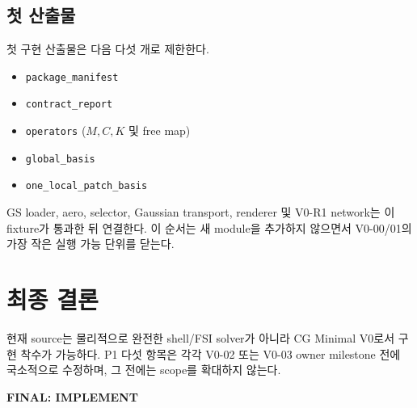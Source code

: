 \documentclass[11pt]{article}
\newcommand{\code}[1]{\texttt{\small #1}}
\begin{document}
\subsection{첫 산출물}

첫 구현 산출물은 다음 다섯 개로 제한한다.
\begin{itemize}
  \item \code{package\_manifest}
  \item \code{contract\_report}
  \item \code{operators} ($M,C,K$ 및 free map)
  \item \code{global\_basis}
  \item \code{one\_local\_patch\_basis}
\end{itemize}

GS loader, aero, selector, Gaussian transport, renderer 및 V0-R1 network는 이 fixture가 통과한 뒤 연결한다.
이 순서는 새 module을 추가하지 않으면서 V0-00/01의 가장 작은 실행 가능 단위를 닫는다.

\section*{최종 결론}

현재 source는 물리적으로 완전한 shell/FSI solver가 아니라 CG Minimal V0로서 구현 착수가 가능하다.
P1 다섯 항목은 각각 V0-02 또는 V0-03 owner milestone 전에 국소적으로 수정하며,
그 전에는 scope를 확대하지 않는다.

\begin{center}
\Large\textbf{FINAL: IMPLEMENT}
\end{center}
\end{document}
